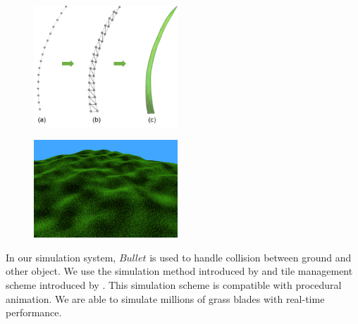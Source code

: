 \documentclass[10pt,journal,compsoc]{IEEEtran}
\begin{document}
\begin{figure}
    \centering
    \includegraphics[width=0.48\textwidth]{figs/expansion.jpg}
    \label{fig:expasion}
\end{figure}

\begin{figure}
    \centering
    \includegraphics[width=0.48\textwidth]{figs/density.png}
    \label{fig:density}
\end{figure}
In our simulation system, $Bullet$ is used to handle collision between ground and other object. We use the simulation method introduced by \cite{han2012real} and tile management scheme introduced by \cite{fan2015simulation}. This simulation scheme is compatible with procedural animation. We are able to simulate millions of grass blades with real-time performance.
\end{document}
